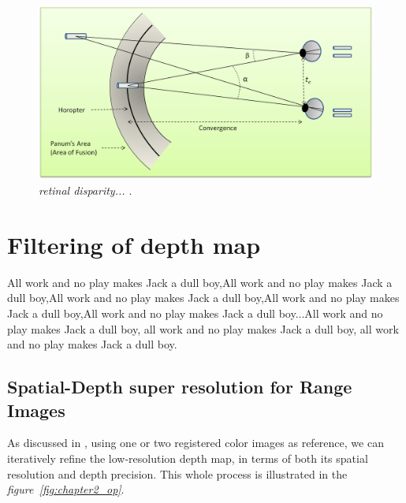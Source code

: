 \begin{figure}[ht]
\centerline{\includegraphics[width=1.0\textwidth]{retinal_disparity.png}}
\caption{\textit{retinal disparity... \cite{bib:production_rules}} \label{fig:retinal disparity}.}
\end{figure}

\section{Filtering of depth map}
All work and no play makes Jack a dull boy,All work and no play makes Jack a dull boy,All work and no play makes Jack a dull boy,All work and no play makes Jack a dull boy,All work and no play makes Jack a dull boy...All work and no play makes Jack a dull boy, all work and no play makes Jack a dull boy, all work and no play makes Jack a dull boy.

\subsection{Spatial-Depth super resolution for Range Images}
As discussed in \cite{Spatial_Depth_Super_Resolution}, using one or two registered color images as reference, we can iteratively refine the low-resolution depth map, in terms of both its spatial resolution and depth precision. This whole process is illustrated in the \textit{figure~\ref{fig:chapter2_op}}.


